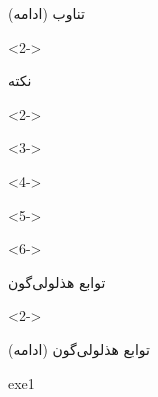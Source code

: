 \def\EMtitlesize{26}\def\EMtitleskip{31}
\begin{frame}{تناوب (ادامه)}
\begin{minipage}[t]{500bp}\vspace{0pt}
\begin{uncoverenv}<2->
\end{uncoverenv}
\EMgap
\end{minipage}
\end{frame}

\def\EMtitlesize{26}\def\EMtitleskip{31}
\begin{frame}{نکته}
\begin{uncoverenv}<2->
\end{uncoverenv}
\EMgap
\begin{uncoverenv}<3->
\end{uncoverenv}
\EMgap
\begin{uncoverenv}<4->
\end{uncoverenv}
\EMgap
\begin{uncoverenv}<5->
\vspace{3bp}
\end{uncoverenv}
\EMgap
\begin{uncoverenv}<6->
\end{uncoverenv}
\end{frame}

\def\EMtitlesize{26}\def\EMtitleskip{31}
\begin{frame}{توابع هذلولی‌گون}
\begin{uncoverenv}<2->
\end{uncoverenv}
\end{frame}

\def\EMtitlesize{26}\def\EMtitleskip{31}
\begin{frame}{توابع هذلولی‌گون (ادامه)}
\begin{EMbox}{exe}{1}{}
\vspace{3bp}
\end{EMbox}
\end{frame}

